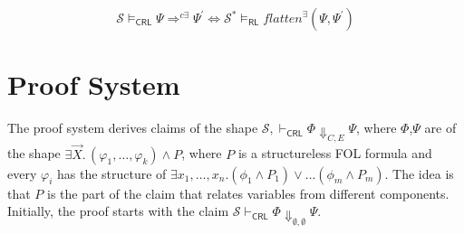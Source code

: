 \documentclass{article}
\newcommand{\RL}{\mathsf{RL}}
\newcommand{\CRL}{\mathsf{CRL}}
\begin{document}
\begin{theorem}\label{thm:correspondence}
\begin{equation*}
\mathcal{S} \vDash_{\CRL} \Psi \Rightarrow^{c\exists} \Psi^\prime \iff \mathcal{S}^* \vDash_\RL \mathit{flatten}^\exists(\Psi, \Psi^\prime)
\end{equation*}
\end{theorem}

\section{Proof System}

The proof system derives claims of the shape
$\mathcal{S}, \vdash_\CRL \Phi \Downarrow_{C,E} \Psi$,
where $\Phi$,$\Psi$ are of the shape
$\exists \vec{X}.\, (\varphi_1, \ldots, \varphi_k) \land P$,
where $P$ is a structureless FOL formula
and every $\varphi_i$ has the structure of
$\exists x_1,\ldots,x_n. (\phi_1 \land P_1) \lor \ldots (\phi_m \land P_m)$.
The idea is that $P$ is the part of the claim that relates variables from different components.
Initially, the proof starts with the claim
$\mathcal{S} \vdash_\CRL \Phi \Downarrow_{\emptyset, \emptyset} \Psi$.
\end{document}
